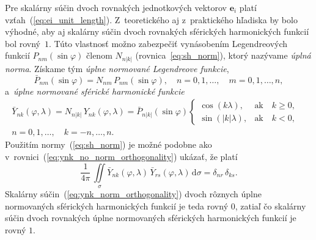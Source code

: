\documentclass[a4paper,12pt]{book}
\newcommand{\diff}{\mathrm d}
\let\vec\mathbf
\begin{document}
Pre skalárny súčin dvoch rovnakých jednotkových vektorov $\vec e_i$ platí 
vzťah~(\ref{eq:ei_unit_length}).  Z~teoretického aj z~praktického hľadiska by 
bolo výhodné, aby aj skalárny súčin dvoch rovnakých sférických harmonických 
funkcií bol rovný~$1$.  Túto vlastnosť možno zabezpečiť vynásobením 
Legendreových funkcií $P_{nm}(\sin\varphi)$ členom $N_{n|k|}$ 
(rovnica~\ref{eq:sh_norm}), ktorý nazývame \emph{úplná norma}.  Získame tým 
\emph{úplne normované Legendreove funkcie},
%
\begin{equation}
\bar{P}_{nm}(\sin\varphi) = N_{nm} \, P_{nm}(\sin\varphi){,} \quad  n = 0, 1, 
\dots,
\quad m = 0, 1, \dots, n{,}
\end{equation}
%
a~\emph{úplne normované sférické harmonické funkcie}
%
\begin{equation}
\label{eq:ynk_norm}
\begin{split}
\bar{Y}_{nk}(\varphi, \lambda) = N_{n|k|} \, Y_{nk}(\varphi, \lambda)
= \bar{P}_{n|k|}(\sin\varphi)
%
\begin{cases}
\cos(k\lambda){,}    &\text{ak} \quad k \geq 0{,}\\
\sin(|k|\lambda){,}  &\text{ak} \quad k < 0{,}
\end{cases}
&
%
\\
n = 0, 1, \dots, \quad k = -n, \dots, n{.}&
\end{split}
\end{equation}
%
Použitím normy~(\ref{eq:sh_norm}) je možné podobne ako 
v~rovnici~(\ref{eq:ynk_no_norm_orthogonality}) ukázať, že platí
%
\begin{equation}
\label{eq:ynk_norm_orthogonality}
\frac{1}{4\pi} \, \iint\limits_{\sigma} \bar{Y}_{nk}(\varphi, \lambda) \,
\bar{Y}_{rs}(\varphi, \lambda) \, \diff \sigma = \delta_{nr} \, \delta_{ks}{.}
\end{equation}
%
Skalárny súčin~(\ref{eq:ynk_norm_orthogonality}) dvoch rôznych úplne
normovaných sférických harmonických funkcií je teda rovný 0, zatiaľ čo skalárny
súčin dvoch rovnakých úplne normovaných sférických harmonických funkcií je
rovný $1$.
\end{document}
